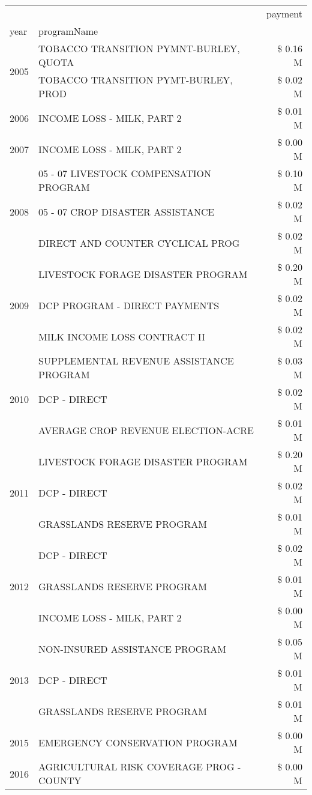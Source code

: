 \begin{tabular}{llr}
\toprule
 &  & payment \\
year & programName &  \\
\midrule
\multirow[t]{2}{*}{2005} & TOBACCO TRANSITION PYMNT-BURLEY, QUOTA & \$ 0.16 M \\
 & TOBACCO TRANSITION PYMT-BURLEY, PROD & \$ 0.02 M \\
\cline{1-3}
2006 & INCOME LOSS - MILK, PART 2 & \$ 0.01 M \\
\cline{1-3}
2007 & INCOME LOSS - MILK, PART 2 & \$ 0.00 M \\
\cline{1-3}
\multirow[t]{3}{*}{2008} & 05 - 07 LIVESTOCK COMPENSATION PROGRAM & \$ 0.10 M \\
 & 05 - 07 CROP DISASTER ASSISTANCE & \$ 0.02 M \\
 & DIRECT AND COUNTER CYCLICAL PROG & \$ 0.02 M \\
\cline{1-3}
\multirow[t]{3}{*}{2009} & LIVESTOCK FORAGE DISASTER  PROGRAM & \$ 0.20 M \\
 & DCP PROGRAM - DIRECT PAYMENTS & \$ 0.02 M \\
 & MILK INCOME LOSS CONTRACT II & \$ 0.02 M \\
\cline{1-3}
\multirow[t]{3}{*}{2010} & SUPPLEMENTAL REVENUE ASSISTANCE PROGRAM & \$ 0.03 M \\
 & DCP - DIRECT & \$ 0.02 M \\
 & AVERAGE CROP REVENUE ELECTION-ACRE & \$ 0.01 M \\
\cline{1-3}
\multirow[t]{3}{*}{2011} & LIVESTOCK FORAGE DISASTER PROGRAM & \$ 0.20 M \\
 & DCP - DIRECT & \$ 0.02 M \\
 & GRASSLANDS RESERVE PROGRAM & \$ 0.01 M \\
\cline{1-3}
\multirow[t]{3}{*}{2012} & DCP - DIRECT & \$ 0.02 M \\
 & GRASSLANDS RESERVE PROGRAM & \$ 0.01 M \\
 & INCOME LOSS - MILK, PART 2 & \$ 0.00 M \\
\cline{1-3}
\multirow[t]{3}{*}{2013} & NON-INSURED ASSISTANCE PROGRAM & \$ 0.05 M \\
 & DCP - DIRECT & \$ 0.01 M \\
 & GRASSLANDS RESERVE PROGRAM & \$ 0.01 M \\
\cline{1-3}
2015 & EMERGENCY CONSERVATION PROGRAM & \$ 0.00 M \\
\cline{1-3}
\multirow[t]{3}{*}{2016} & AGRICULTURAL RISK COVERAGE PROG - COUNTY & \$ 0.00 M \\

\end{tabular}
